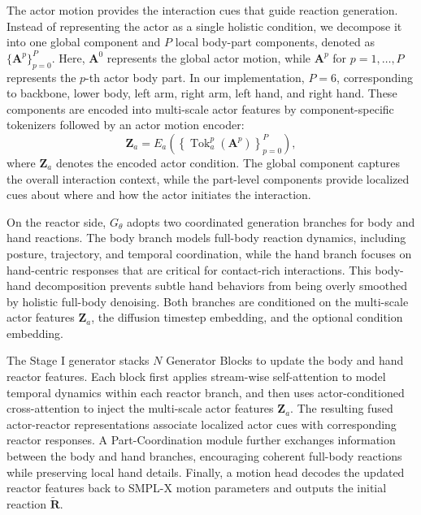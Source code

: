 \documentclass{article}
\begin{document}
The actor motion provides the interaction cues that guide reaction generation. Instead of representing the actor as a single holistic condition, we decompose it into one global component and $P$ local body-part components, denoted as $\{\mathbf{A}^{p}\}_{p=0}^{P}$. Here, $\mathbf{A}^{0}$ represents the global actor motion, while $\mathbf{A}^{p}$ for $p=1,\ldots,P$ represents the $p$-th actor body part. In our implementation, $P=6$, corresponding to backbone, lower body, left arm, right arm, left hand, and right hand. These components are encoded into multi-scale actor features by component-specific tokenizers followed by an actor motion encoder:
\begin{equation}
\mathbf{Z}_{a}
=
E_a
\left(
\left\{
\operatorname{Tok}_{a}^{p}(\mathbf{A}^{p})
\right\}_{p=0}^{P}
\right),
\end{equation}
where $\mathbf{Z}_{a}$ denotes the encoded actor condition. The global component captures the overall interaction context, while the part-level components provide localized cues about where and how the actor initiates the interaction.

On the reactor side, $G_{\theta}$ adopts two coordinated generation branches for body and hand reactions. The body branch models full-body reaction dynamics, including posture, trajectory, and temporal coordination, while the hand branch focuses on hand-centric responses that are critical for contact-rich interactions. This body-hand decomposition prevents subtle hand behaviors from being overly smoothed by holistic full-body denoising. Both branches are conditioned on the multi-scale actor features $\mathbf{Z}_{a}$, the diffusion timestep embedding, and the optional condition embedding.

The Stage I generator stacks $N$ Generator Blocks to update the body and hand reactor features. Each block first applies stream-wise self-attention to model temporal dynamics within each reactor branch, and then uses actor-conditioned cross-attention to inject the multi-scale actor features $\mathbf{Z}_{a}$. The resulting fused actor-reactor representations associate localized actor cues with corresponding reactor responses. A Part-Coordination module further exchanges information between the body and hand branches, encouraging coherent full-body reactions while preserving local hand details. Finally, a motion head decodes the updated reactor features back to SMPL-X motion parameters and outputs the initial reaction $\widetilde{\mathbf{R}}$.
\end{document}
